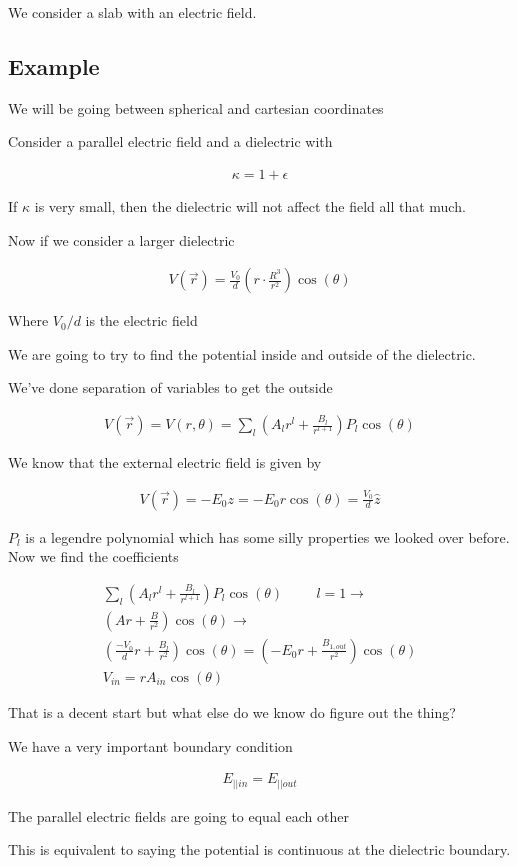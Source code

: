 \documentclass[fleqn]{report}
\newcommand{\hp}{\hspace{1cm}}
\newcommand{\equations} [1] {
\begin{gather*}
#1
\end{gather*}
}
\begin{document}
We consider a slab with an electric field. 

\subsection{Example}
We will be going between spherical and cartesian coordinates 

Consider a parallel electric field and a dielectric with 
\equations{
    \kappa = 1 + \epsilon
}
If $\kappa$ is very small, then the dielectric will not affect the field 
all that much. 

Now if we consider a larger dielectric 
\equations{
    V(\vec r )
    =
    \frac{V_0}{d}
    \left(
        r \cdot 
        \frac{R^3}{r^2}
    \right)
    \cos(\theta)
}
Where $V_0/d$ is the electric field 

We are going to try to find the potential inside and outside of the 
dielectric.

We've done separation of variables to get the outside 
\equations{
    V(\vec r) = V(r, \theta)
    =
    \sum_l 
    \left(
        A_l r^l
        +
        \frac{B_l}{r^{l+1}}
    \right)
    P_l
    \cos(\theta)
}

We know that the external electric field is given by 
\equations{
    V(\vec r) = - E_0 z = -E_0 r \cos(\theta) = \frac{V_0}{d} \hat z 
}

$P_l$ is a legendre polynomial which has some silly properties we looked 
over before. 
Now we find the coefficients 
\equations{
    \sum_l 
    \left(
        A_l r^l
        +
        \frac{B_l}{r^{l+1}}
    \right)
    P_l
    \cos(\theta)
    \hp 
    l = 1
    \rightarrow 
    \\
    \left(
        A r
        +
        \frac{B}{r^{2}}
    \right)
    \cos(\theta)
    \rightarrow 
    \\
    \left(
        \frac{-V_0}{d} r
        +
        \frac{B_l}{r^{2}}
    \right)
    \cos(\theta)
    =
    \left(
        -E_0 r
        +
        \frac{B_{1, out}}{r^{2}}
    \right)
    \cos(\theta)
    \\
    V_{in} 
    = 
    r A_{in} \cos(\theta)
}

That is a decent start but what else do we know do figure out the thing? 

We have a very important boundary condition 
\equations{
    E_{|| in} = E_{|| out}
}
The parallel electric fields are going to equal each other

This is equivalent to saying the potential is continuous at the dielectric 
boundary.
\end{document}
